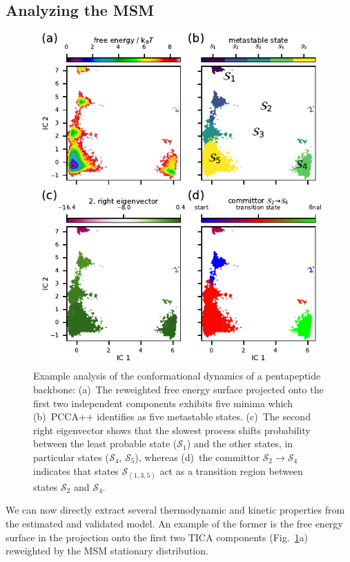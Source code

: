 \documentclass[9pt,tutorial]{livecoms}
\begin{document}
\subsection{Analyzing the MSM}

\begin{figure}
\includegraphics{figure_4}
\caption{Example analysis of the conformational dynamics of a pentapeptide backbone:
(a)~The reweighted free energy surface projected onto the first two independent components exhibits five minima which
(b)~PCCA++ identifies as five metastable states.
(c)~The second right eigenvector shows that the slowest process shifts probability between the least probable state ($\mathcal{S}_1$) and the other states, in particular states ($\mathcal{S}_4$, $\mathcal{S}_5$), whereas
(d)~the committor $\mathcal{S}_2\to\mathcal{S}_4$ indicates that states $\mathcal{S}_{(1,3,5)}$ act as a transition region between states $\mathcal{S}_2$ and $\mathcal{S}_4$.}
\label{fig:msm-analysis}
\end{figure}

We can now directly extract several thermodynamic and kinetic properties from the estimated and validated model.
An example of the former is the free energy surface in the projection onto the first two TICA components (Fig.~\ref{fig:msm-analysis}a) reweighted by the MSM stationary distribution.
\end{document}
